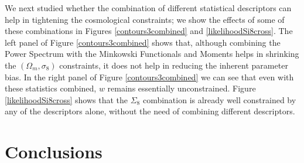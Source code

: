 \documentclass[reprint,aps,prd,superscriptaddress,showkeys,showpacs]{revtex4-1}
\begin{document}

We next studied whether the combination of different statistical descriptors can help in tightening the cosmological constraints; we show the effects of some of these combinations in Figures \ref{contours3combined} and \ref{likelihoodSi8cross}. The left panel of Figure \ref{contours3combined} shows that, although combining the Power Spectrum with the Minkowski Functionals and Moments helps in shrinking the $(\Omega_m,\sigma_8)$ constraints, it does not help in reducing the inherent parameter bias. In the right panel of Figure \ref{contours3combined} we can see that even with these statistics combined, $w$ remains essentially unconstrained. Figure \ref{likelihoodSi8cross} shows that the $\Sigma_8$ combination is already well constrained by any of the descriptors alone, without the need of combining different descriptors.   


\section{Conclusions}
\end{document}
